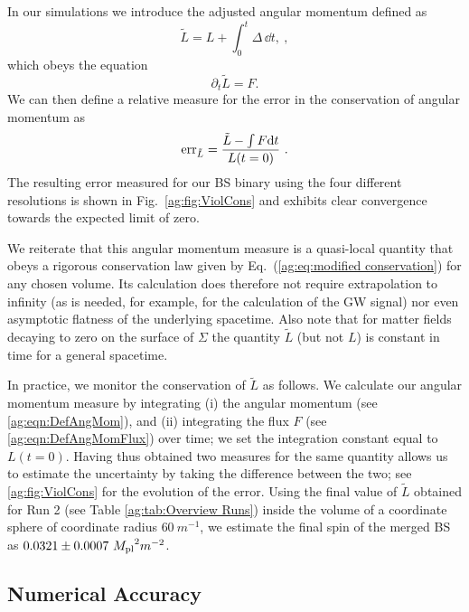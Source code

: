 In our simulations we introduce the adjusted angular momentum
defined as
\begin{equation}
 \tilde{L} = {L}+\int_{0}^t {\Delta} \,\dd t, \label{ag:eqn:DefAngMom}~,
\end{equation}
which obeys the equation
\begin{equation}
\label{ag:eq:modified conservation}\partial_t\tilde{L} = {F}.
\end{equation}
We can then define a relative measure for the error in the
conservation of angular momentum as
\begin{equation}
    {\rm err }_{\tilde{L}} = \frac{\tilde{L} - \int F {\rm d}t}{{L}(t=0)}~.\label{ag:eqn:ang_mom}
\end{equation}
The resulting error measured for our BS binary using the
four different resolutions is shown in Fig.~\ref{ag:fig:ViolCons}
and exhibits clear convergence towards the expected limit of
zero.

We reiterate that this angular momentum measure is a quasi-local
quantity that obeys a rigorous conservation law
given by Eq.~(\ref{ag:eq:modified conservation}) for
any chosen volume.
Its calculation does therefore not require extrapolation
to infinity (as is needed, for example, for the calculation
of the GW signal) nor even asymptotic flatness of the underlying spacetime.
Also note that for matter fields decaying to zero on the surface of $\Sigma$ the
quantity $\tilde{L}$ (but not $L$) is constant in time for a general spacetime.

In practice, we monitor the conservation of $\tilde{L}$ as follows.
We calculate our angular momentum measure by integrating (i) the angular momentum (see \ref{ag:eqn:DefAngMom}), and (ii) integrating the flux $F$ (see \ref{ag:eqn:DefAngMomFlux}) over time; we set the integration constant equal to ${L}(t=0)$. Having thus obtained two measures for the same quantity allows us to estimate the uncertainty by taking the difference between the two; see \ref{ag:fig:ViolCons} for the evolution of the error.
Using the final value of $\tilde{L}$ obtained for Run 2
(see Table \ref{ag:tab:Overview Runs}) inside the volume of
a coordinate sphere of coordinate radius $60~m^{-1}$, we estimate the final spin
of the merged BS as $0.0321 \pm 0.0007~{M_{\rm pl}}^2 m^{-2}$.

\subsection{Numerical Accuracy}
\label{ag:sec:numacc}

